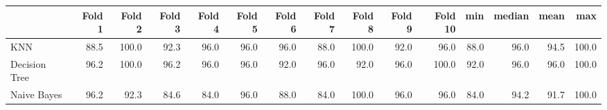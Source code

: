 \begin{tabular}{lrrrrrrrrrrrrrr}
\toprule
{} & Fold 1 & Fold 2 & Fold 3 & Fold 4 & Fold 5 & Fold 6 & Fold 7 & Fold 8 & Fold 9 & Fold 10 &   min & median &  mean &    max \\
\midrule
KNN           & 88.5 & 100.0 & 92.3 & 96.0 & 96.0 & 96.0 & 88.0 & 100.0 & 92.0 & 96.0 & 88.0 & 96.0 & 94.5 & 100.0 \\
Decision Tree & 96.2 & 100.0 & 96.2 & 96.0 & 96.0 & 92.0 & 96.0 & 92.0 & 96.0 & 100.0 & 92.0 & 96.0 & 96.0 & 100.0 \\
Naive Bayes   & 96.2 & 92.3 & 84.6 & 84.0 & 96.0 & 88.0 & 84.0 & 100.0 & 96.0 & 96.0 & 84.0 & 94.2 & 91.7 & 100.0 \\
\bottomrule
\end{tabular}

